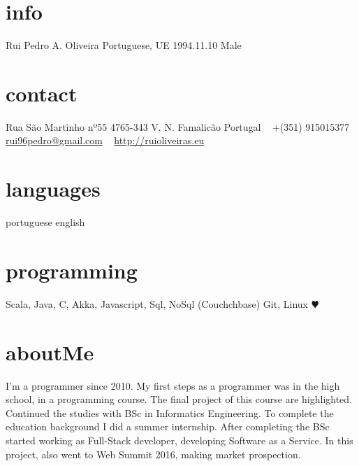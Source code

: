 \documentclass[]{friggeri-cv} %
\begin{document}


\begin{aside} %
\section{info}
Rui Pedro A. Oliveira
Portuguese, UE
1994.11.10
Male
\section{contact}
Rua São Martinho nº55
4765-343 V. N. Famalicão
Portugal
~
+(351) 915015377
~
\href{mailto:rui96pedro@gmail.com}{rui96pedro@gmail.com}
~
\href{http://ruioliveiras.eu}{http://ruioliveiras.eu}
~
\section{languages}
portuguese
english
\section{programming}
Scala, Java, C,
Akka,
Javascript,
Sql, NoSql (Couchchbase)
Git, Linux {\color{red} $\varheartsuit$}
~
\end{aside}

\section{aboutMe}
I'm a programmer since 2010.
My first steps as a programmer was in the high school, in a programming course. The final project of this course are highlighted.
Continued the studies with BSc in Informatics Engineering.
To complete the education background I did a summer internship.
After completing the BSc started working as Full-Stack developer, developing Software as a Service.
In this project, also went to Web Summit 2016, making market prospection.

\end{document}
